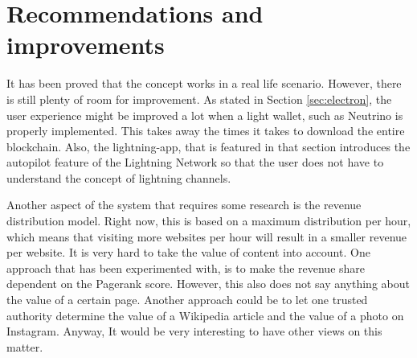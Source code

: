  

\section{Recommendations and improvements}
It has been proved that the concept works in a real life scenario. However, there is still plenty of room for improvement. As stated in Section \ref{sec:electron}, the user experience might be improved a lot when a light wallet, such as Neutrino is properly implemented. This takes away the times it takes to download the entire blockchain. Also, the lightning-app, that is featured in that section introduces the autopilot feature of the Lightning Network so that the user does not have to understand the concept of lightning channels. 

Another aspect of the system that requires some research is the revenue distribution model. Right now, this is based on a maximum distribution per hour, which means that visiting more websites per hour will result in a smaller revenue per website. It is very hard to take the value of content into account. One approach that has been experimented with, is to make the revenue share dependent on the Pagerank score. However, this also does not say anything about the value of a certain page. Another approach could be to let one trusted authority determine the value of a Wikipedia article and the value of a photo on Instagram. Anyway, It would be very interesting to have other views on this matter. 